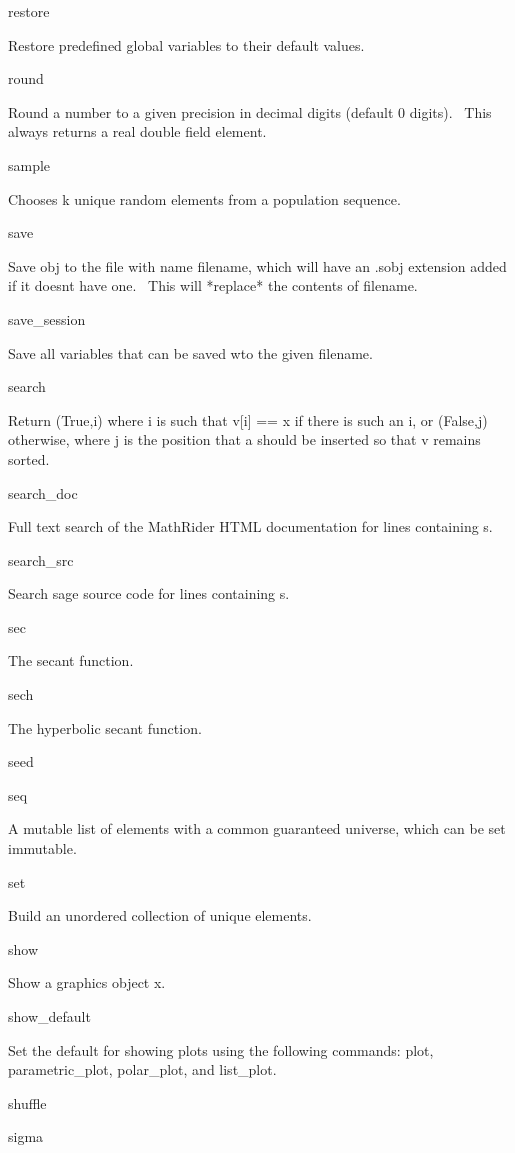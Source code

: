\documentclass[12pt,twoside]{book}
\begin{document}
restore

Restore predefined global variables to their default values.

round

Round a number to a given precision in decimal digits (default 0 digits). \ This always returns a real double field element.

sample

Chooses k unique random elements from a population sequence.

save

Save obj to the file with name filename, which will have an .sobj extension added if it doesn{\textquotesingle}t have one. \ This will *replace* the contents of filename.

save\_session

Save all variables that can be saved wto the given filename.

search

Return (True,i) where i is such that v[i] == x if there is such an i, or (False,j) otherwise, where j is the position that a should be inserted so that v remains sorted.

search\_doc

Full text search of the MathRider HTML documentation for lines containing s.

search\_src

Search sage source code for lines containing s.

sec

The secant function.

sech

The hyperbolic secant function.

seed


\bigskip

seq

A mutable list of elements with a common guaranteed universe, which can be set immutable.

set

Build an unordered collection of unique elements.

show

Show a graphics object x.

show\_default

Set the default for showing plots using the following commands: plot, parametric\_plot, polar\_plot, and list\_plot.

shuffle


\bigskip

sigma
\end{document}
